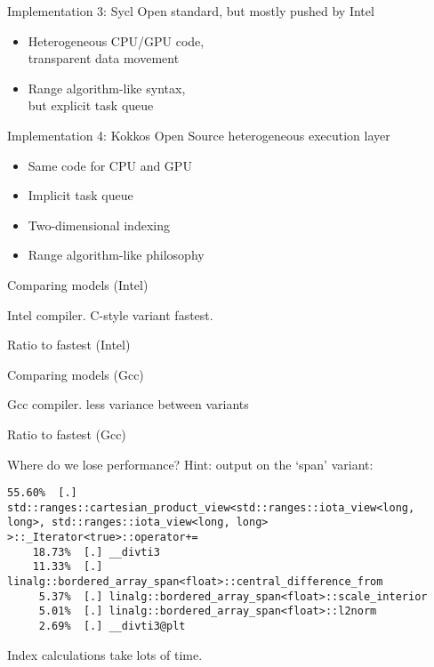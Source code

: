 \documentclass[10pt]{beamer}
\begin{document}
\begin{frame}[containsverbatim]{Implementation 3: Sycl}
  Open standard, but mostly pushed by Intel
  \begin{itemize}
  \item Heterogeneous CPU/GPU code,\\
    transparent data movement
  \item Range algorithm-like syntax,\\
    but explicit task queue
  \end{itemize}
\end{frame}

\begin{frame}[containsverbatim]{Implementation 4: Kokkos}
  Open Source heterogeneous execution layer
  \begin{itemize}
  \item Same code for CPU and GPU
  \item Implicit task queue
  \item Two-dimensional indexing
  \item Range algorithm-like philosophy
  \end{itemize}
\end{frame}

\begin{frame}[containsverbatim]{Comparing models (Intel)}
  

  Intel compiler. C-style variant fastest.
\end{frame}

\begin{frame}[containsverbatim]{Ratio to fastest (Intel)}
  
\end{frame}

\begin{frame}[containsverbatim]{Comparing models (Gcc)}
  

  Gcc compiler. less variance between variants
\end{frame}

\begin{frame}[containsverbatim]{Ratio to fastest (Gcc)}
  
\end{frame}

\begin{frame}[containsverbatim]{Where do we lose performance?}
  Hint:  output on the `span' variant:
\begin{lstlisting}[language=verbatim]
    55.60%  [.] std::ranges::cartesian_product_view<std::ranges::iota_view<long, long>, std::ranges::iota_view<long, long> >::_Iterator<true>::operator+=
    18.73%  [.] __divti3
    11.33%  [.] linalg::bordered_array_span<float>::central_difference_from
     5.37%  [.] linalg::bordered_array_span<float>::scale_interior
     5.01%  [.] linalg::bordered_array_span<float>::l2norm
     2.69%  [.] __divti3@plt
\end{lstlisting}
Index calculations take lots of time.
\end{frame}
\end{document}
